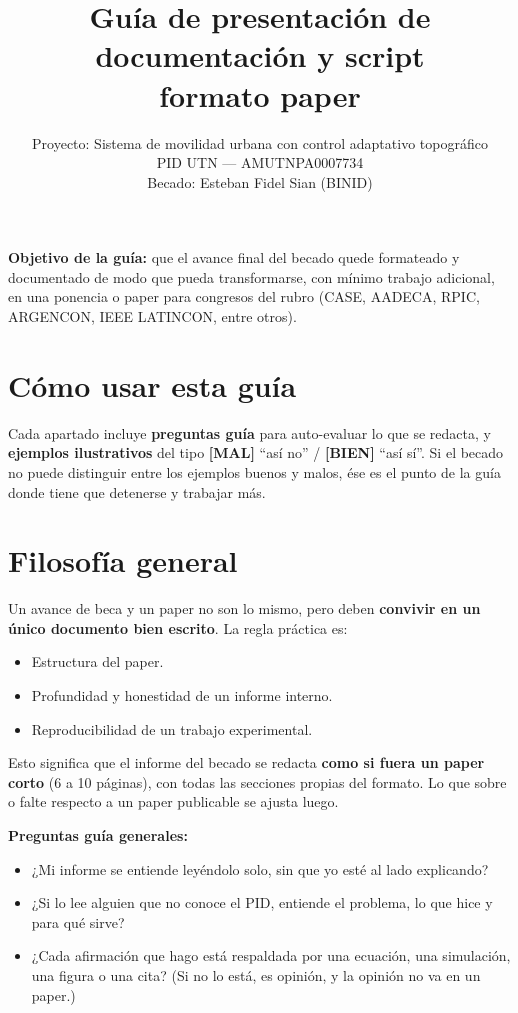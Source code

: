\documentclass[11pt,a4paper]{article}
\title{Guía de presentación de documentación y script\\\large{formato paper}}
\author{Proyecto: Sistema de movilidad urbana con control adaptativo topográfico\\
        PID UTN --- AMUTNPA0007734\\[4pt]
        Becado: Esteban Fidel Sian (BINID)}
\date{}
\newcommand{\malo}{\textcolor{red!70!black}{\textbf{[MAL]}}}
\newcommand{\bueno}{\textcolor{green!50!black}{\textbf{[BIEN]}}}
\begin{document}
\maketitle

\noindent\textbf{Objetivo de la guía:} que el avance final del becado quede formateado y documentado de modo que pueda transformarse, con mínimo trabajo adicional, en una ponencia o paper para congresos del rubro (CASE, AADECA, RPIC, ARGENCON, IEEE LATINCON, entre otros).

\hrulefill

\section*{Cómo usar esta guía}

Cada apartado incluye \textbf{preguntas guía} para auto-evaluar lo que se redacta, y \textbf{ejemplos ilustrativos} del tipo \malo{} ``así no'' / \bueno{} ``así sí''. Si el becado no puede distinguir entre los ejemplos buenos y malos, ése es el punto de la guía donde tiene que detenerse y trabajar más.

\hrulefill

\section{Filosofía general}

Un avance de beca y un paper no son lo mismo, pero deben \textbf{convivir en un único documento bien escrito}. La regla práctica es:

\begin{itemize}
    \item Estructura del paper.
    \item Profundidad y honestidad de un informe interno.
    \item Reproducibilidad de un trabajo experimental.
\end{itemize}

Esto significa que el informe del becado se redacta \textbf{como si fuera un paper corto} (6 a 10 páginas), con todas las secciones propias del formato. Lo que sobre o falte respecto a un paper publicable se ajusta luego.

\begin{guia}
\textbf{Preguntas guía generales:}
\begin{itemize}
    \item ¿Mi informe se entiende leyéndolo solo, sin que yo esté al lado explicando?
    \item ¿Si lo lee alguien que no conoce el PID, entiende el problema, lo que hice y para qué sirve?
    \item ¿Cada afirmación que hago está respaldada por una ecuación, una simulación, una figura o una cita? (Si no lo está, es opinión, y la opinión no va en un paper.)
\end{itemize}
\end{guia}
\end{document}
